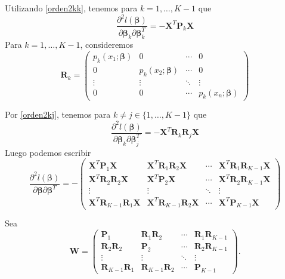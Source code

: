 \documentclass{report}
\begin{document}
  
  Utilizando \ref{orden2kk},  tenemos  para $k=1, \ldots, K-1$ que
  $$
  \frac{\partial^2 l( \boldsymbol{\beta})}{\partial  \boldsymbol{\beta}_k \partial  \boldsymbol{\beta}_k^T}=-\mathbf{X}^T \mathbf{P}_k \mathbf{X}
  $$
  Para $k=1, \ldots, K-1$, consideremos
  $$
  \mathbf{R}_k=\left(\begin{array}{cccc}
  	p_k\left(x_1 ;  \boldsymbol{\beta}\right) & 0 & \cdots & 0 \\
  	0 & p_k\left(x_2 ;  \boldsymbol{\beta}\right) & \cdots & 0 \\
  	\vdots & \vdots & \ddots & \vdots \\
  	0 & 0 & \cdots & p_k\left(x_n ;  \boldsymbol{\beta}\right)
  \end{array}\right)
  $$
  
  
  Por \eqref{orden2kj}, tenemos para $k \neq j \in\{1, \ldots, K-1\}$ que
  $$
  \frac{\partial^2 l( \boldsymbol{\beta})}{\partial  \boldsymbol{\beta}_k \partial  \boldsymbol{\beta}_j^T}=-\mathbf{X}^T \mathbf{R}_k \mathbf{R}_j \mathbf{X}
  $$
  Luego podemos escribir
  $$
  \frac{\partial^2 l( \boldsymbol{\beta})}{\partial  \boldsymbol{\beta} \partial  \boldsymbol{\beta}^T}=-\left(\begin{array}{cccc}
  	\mathbf{X}^T \mathbf{P}_1 \mathbf{X} & \mathbf{X}^T \mathbf{R}_1 \mathbf{R}_2 \mathbf{X} & \cdots & \mathbf{X}^T \mathbf{R}_1 \mathbf{R}_{K-1} \mathbf{X} \\
  	\mathbf{X}^T \mathbf{R}_2 \mathbf{R}_2 \mathbf{X} & \mathbf{X}^T \mathbf{P}_2 \mathbf{X} & \cdots & \mathbf{X}^T \mathbf{R}_2 \mathbf{R}_{K-1} \mathbf{X} \\
  	\vdots & \vdots & \ddots & \vdots \\
  	\mathbf{X}^T \mathbf{R}_{K-1} \mathbf{R}_1 \mathbf{X} & \mathbf{X}^T \mathbf{R}_{K-1} \mathbf{R}_2 \mathbf{X} & \cdots & \mathbf{X}^T \mathbf{P}_{K-1} \mathbf{X}
  \end{array}\right)
  $$
  
  
  Sea 
  $$
  \mathbf{W}=\left(\begin{array}{cccc}
  	\mathbf{P}_1 & \mathbf{R}_1 \mathbf{R}_2 & \cdots & \mathbf{R}_1 \mathbf{R}_{K-1} \\
  	\mathbf{R}_2 \mathbf{R}_2 & \mathbf{P}_2 & \cdots & \mathbf{R}_2 \mathbf{R}_{K-1} \\
  	\vdots & \vdots & \ddots & \vdots \\
  	\mathbf{R}_{K-1} \mathbf{R}_1 & \mathbf{R}_{K-1} \mathbf{R}_2 & \cdots & \mathbf{P}_{K-1}
  \end{array}\right) .
  $$
  
\end{document}
